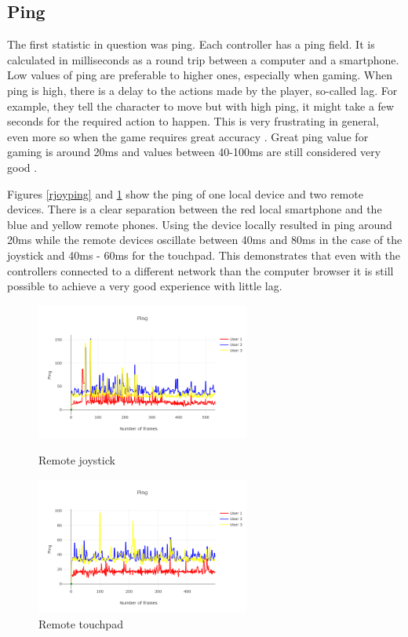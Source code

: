 \documentclass{l4proj}
\begin{document}
\subsection{Ping}
The first statistic in question was ping. Each controller has a ping field. It is calculated in milliseconds as a round trip between a computer and a smartphone. Low values of ping are preferable to higher ones, especially when gaming. When ping is high, there is a delay to the actions made by the player, so-called lag. For example, they tell the character to move but with high ping, it might take a few seconds for the required action to happen. This is very frustrating in general, even more so when the game requires great accuracy \cite{latency}. Great ping value for gaming is around 20ms and values between 40-100ms are still considered very good \cite{ping_value}. \par
Figures \ref{rjoyping} and \ref{rtouchping} show the ping of one local device and two remote devices. There is a clear separation between the red local smartphone and the blue and yellow remote phones. Using the device locally resulted in ping around 20ms while the remote devices oscillate between 40ms and 80ms in the case of the joystick and 40ms - 60ms for the touchpad. This demonstrates that even with the controllers connected to a different network than the computer browser it is still possible to achieve a very good experience with little lag.  \par
\begin{figure}[h!]
    \centering
    \begin{minipage}{0.45\textwidth}
        \centering
        \includegraphics[width=7cm]{./images/rjoyping.png} %
        \caption{Remote joystick}
        \label{rjoyping}
    \end{minipage}\hfill
    \begin{minipage}{0.45\textwidth}
        \centering
        \includegraphics[width=7cm]{./images/rtouchping.png} %
        \caption{Remote touchpad}
        \label{rtouchping}
    \end{minipage}
\end{figure}
\end{document}
